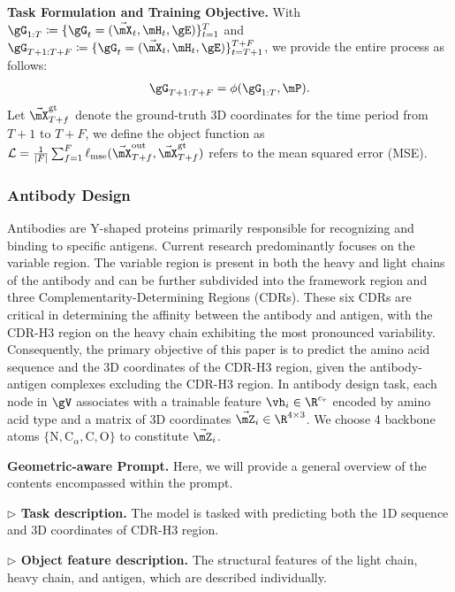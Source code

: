 \textbf{Task Formulation and Training Objective. }
With $\gG_{1:T}\coloneqq\{\gG_{t} = (\Vec{\mX}_{t}, \mH_{t}, \gE)\}_{t=1}^{T}$ and $\gG_{T+1:T+F}\coloneqq\{\gG_{t} = (\Vec{\mX}_{t}, \mH_{t}, \gE)\}_{t=T+1}^{T+F}$, we provide the entire process as follows:
\begin{equation}\label{eq:task_dynamic}
\begin{aligned}
    \gG_{T+1:T+F} = \phi (\gG_{1:T}, \mP). \\
\end{aligned}
\end{equation}
Let $\Vec{\mX}^{\text{gt}}_{T+f}$ denote the ground-truth 3D coordinates for the time period from $T+1$ to $T+F$, we define the object function as $\textstyle\mathcal{L} = \frac{1}{|F|}\sum^{F}_{f=1}\ell_{\mathrm{mse}}(\Vec{\mX}^{\text{out}}_{T+f}, \Vec{\mX}^{\text{gt}}_{T+f})$ refers to the mean squared error (MSE).

\subsubsection{Antibody Design}
\label{sec:3.3.2}
Antibodies are Y-shaped proteins primarily responsible for recognizing and binding to specific antigens. Current research predominantly focuses on the variable region. The variable region is present in both the heavy and light chains of the antibody and can be further subdivided into the framework region and three Complementarity-Determining Regions (CDRs). These six CDRs are critical in determining the affinity between the antibody and antigen, with the CDR-H3 region on the heavy chain exhibiting the most pronounced variability. Consequently, the primary objective of this paper is to predict the amino acid sequence and the 3D coordinates of the CDR-H3 region, given the antibody-antigen complexes excluding the CDR-H3 region. In antibody design task, each node in $\gV$ associates with a trainable feature $\vh_i\in\R^{c_r}$ encoded by amino acid type and a matrix of 3D coordinates $\Vec{\mZ}_i \in \R^{4 \times 3}$. We choose 4 backbone atoms $\{\text{N}, \text{C}_\alpha, \text{C}, \text{O}\}$ to constitute $\Vec{\mZ}_i$.

\textbf{Geometric-aware Prompt.}
Here, we will provide a general overview of the contents encompassed within the prompt.

\textbf{$\triangleright$ Task description.} The model is tasked with predicting both the 1D sequence and 3D coordinates of CDR-H3 region. 

\textbf{$\triangleright$ Object feature description.} The structural features of the light chain, heavy chain, and antigen, which are described individually.



